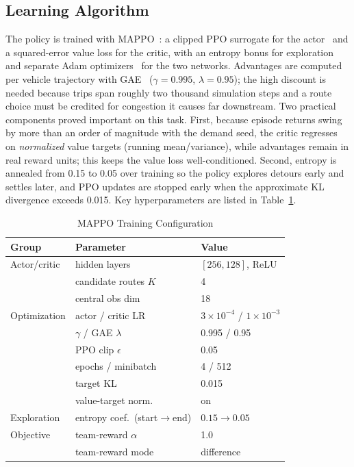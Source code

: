 \subsection{Learning Algorithm}
The policy is trained with MAPPO~\cite{yu2022mappo}: a clipped PPO surrogate for the
actor~\cite{schulman2017ppo} and a squared-error value loss for the critic, with an
entropy bonus for exploration and separate Adam optimizers~\cite{kingma2015adam} for the
two networks. Advantages are computed per vehicle trajectory with
GAE~\cite{schulman2016gae} ($\gamma{=}0.995$, $\lambda{=}0.95$); the high discount is
needed because trips span roughly two thousand simulation steps and a route choice must
be credited for congestion it causes far downstream. Two practical components proved
important on this task. First, because episode returns swing by more than an order of
magnitude with the demand seed, the critic regresses on \emph{normalized} value targets
(running mean/variance), while advantages remain in real reward units; this keeps the
value loss well-conditioned. Second, entropy is annealed from 0.15 to 0.05 over training
so the policy explores detours early and settles later, and PPO updates are stopped early
when the approximate KL divergence exceeds 0.015. Key hyperparameters are listed in
Table~\ref{tab:hyper}.

\begin{table}[!t]
\caption{MAPPO Training Configuration}
\label{tab:hyper}
\centering
\footnotesize
\begin{tabular}{lll}
\toprule
Group & Parameter & Value \\
\midrule
Actor/critic & hidden layers & $[256,128]$, ReLU \\
             & candidate routes $K$ & 4 \\
             & central obs dim & 18 \\
Optimization & actor / critic LR & $3\times10^{-4}$ / $1\times10^{-3}$ \\
             & $\gamma$ / GAE $\lambda$ & 0.995 / 0.95 \\
             & PPO clip $\epsilon$ & 0.05 \\
             & epochs / minibatch & 4 / 512 \\
             & target KL & 0.015 \\
             & value-target norm. & on \\
Exploration  & entropy coef.\ (start$\to$end) & $0.15 \to 0.05$ \\
Objective    & team-reward $\alpha$ & 1.0 \\
             & team-reward mode & difference \\
\bottomrule
\end{tabular}
\end{table}

